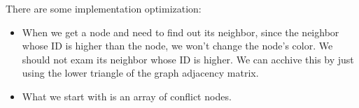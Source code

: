 \documentclass[12pt] {article}
\begin{document}
There are some implementation optimization:
\begin{itemize}
\item When we get a node and need to find out its neighbor, since the neighbor whose ID is higher than the node, we won't change the node's color. We should not exam its neighbor whose ID is higher. We can acchive this by just using the lower triangle of the graph adjacency matrix. 

\item What we start with is an array of conflict nodes.

\begin{figure}[!tbh]
\centering        
   \caption{ }
   \label{fig:fig3}
\end{figure} 


\end{itemize}
\end{document}
